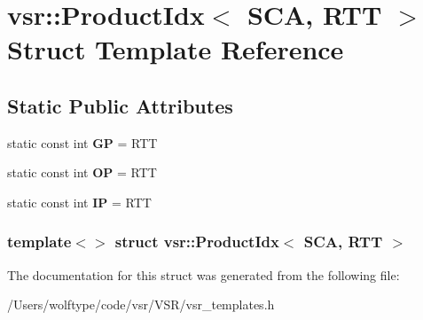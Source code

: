\hypertarget{structvsr_1_1_product_idx_3_01_s_c_a_00_01_r_t_t_01_4}{\section{vsr\-:\-:Product\-Idx$<$ S\-C\-A, R\-T\-T $>$ Struct Template Reference}
\label{structvsr_1_1_product_idx_3_01_s_c_a_00_01_r_t_t_01_4}
}
\subsection*{Static Public Attributes}
\begin{DoxyCompactItemize}
\item 
\hypertarget{structvsr_1_1_product_idx_3_01_s_c_a_00_01_r_t_t_01_4_a8c167fa6eace91552549dd4a183f215e}{static const int {\bfseries G\-P} = R\-T\-T}\label{structvsr_1_1_product_idx_3_01_s_c_a_00_01_r_t_t_01_4_a8c167fa6eace91552549dd4a183f215e}

\item 
\hypertarget{structvsr_1_1_product_idx_3_01_s_c_a_00_01_r_t_t_01_4_a41ad794625fe4af4d97dde679c8250bd}{static const int {\bfseries O\-P} = R\-T\-T}\label{structvsr_1_1_product_idx_3_01_s_c_a_00_01_r_t_t_01_4_a41ad794625fe4af4d97dde679c8250bd}

\item 
\hypertarget{structvsr_1_1_product_idx_3_01_s_c_a_00_01_r_t_t_01_4_a2533968cd6400263eab8f87ce0dedee0}{static const int {\bfseries I\-P} = R\-T\-T}\label{structvsr_1_1_product_idx_3_01_s_c_a_00_01_r_t_t_01_4_a2533968cd6400263eab8f87ce0dedee0}

\end{DoxyCompactItemize}
\subsubsection*{template$<$$>$ struct vsr\-::\-Product\-Idx$<$ S\-C\-A, R\-T\-T $>$}



The documentation for this struct was generated from the following file\-:\begin{DoxyCompactItemize}
\item 
/\-Users/wolftype/code/vsr/\-V\-S\-R/vsr\-\_\-templates.\-h\end{DoxyCompactItemize}
